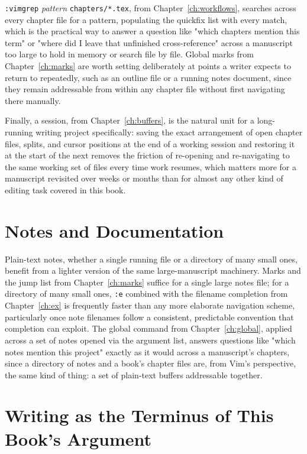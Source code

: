 \texttt{:vimgrep} \textit{pattern} \texttt{chapters/*.tex}, from Chapter~\ref{ch:workflows}, searches across every chapter file for a pattern, populating the quickfix list with every match, which is the practical way to answer a question like "which chapters mention this term" or "where did I leave that unfinished cross-reference" across a manuscript too large to hold in memory or search file by file. Global marks from Chapter~\ref{ch:marks} are worth setting deliberately at points a writer expects to return to repeatedly, such as an outline file or a running notes document, since they remain addressable from within any chapter file without first navigating there manually.

Finally, a session, from Chapter~\ref{ch:buffers}, is the natural unit for a long-running writing project specifically: saving the exact arrangement of open chapter files, splits, and cursor positions at the end of a working session and restoring it at the start of the next removes the friction of re-opening and re-navigating to the same working set of files every time work resumes, which matters more for a manuscript revisited over weeks or months than for almost any other kind of editing task covered in this book.

\section{Notes and Documentation}

Plain-text notes, whether a single running file or a directory of many small ones, benefit from a lighter version of the same large-manuscript machinery. Marks and the jump list from Chapter~\ref{ch:marks} suffice for a single large notes file; for a directory of many small ones, \texttt{:e} combined with the filename completion from Chapter~\ref{ch:ex} is frequently faster than any more elaborate navigation scheme, particularly once note filenames follow a consistent, predictable convention that completion can exploit. The global command from Chapter~\ref{ch:global}, applied across a set of notes opened via the argument list, answers questions like "which notes mention this project" exactly as it would across a manuscript's chapters, since a directory of notes and a book's chapter files are, from Vim's perspective, the same kind of thing: a set of plain-text buffers addressable together.

\section{Writing as the Terminus of This Book's Argument}


